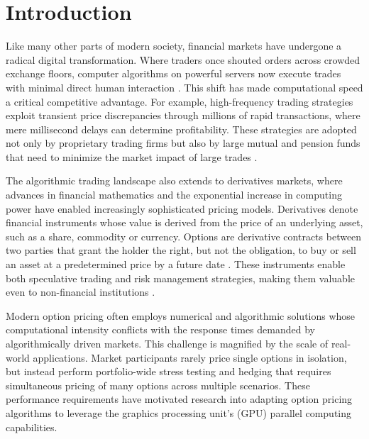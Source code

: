 \documentclass[english,12pt,a4paper,pdftex,sci,utf8]{aaltothesis}
\begin{document}

\section{Introduction}
\thispagestyle{empty}
Like many other parts of modern society, financial markets have undergone a radical digital transformation. Where traders once shouted orders across crowded exchange floors, computer algorithms on powerful servers now execute trades with minimal direct human interaction \cite{mcgowan2010rise, mackenzie2018material}. This shift has made computational speed a critical competitive advantage. For example, high-frequency trading strategies exploit transient price discrepancies through millions of rapid transactions, where mere millisecond delays can determine profitability. These strategies are adopted not only by proprietary trading firms but also by large mutual and pension funds that need to minimize the market impact of large trades \cite{mcgowan2010rise}.

The algorithmic trading landscape also extends to derivatives markets, where advances in financial mathematics \cite{merton1994influence} and the exponential increase in computing power \cite{nordhaus2007two} have enabled increasingly sophisticated pricing models. Derivatives denote financial instruments whose value is derived from the price of an underlying asset, such as a share, commodity or currency. Options are derivative contracts between two parties that grant the holder the right, but not the obligation, to buy or sell an asset at a predetermined price by a future date \cite{hull2018}. These instruments enable both speculative trading and risk management strategies, making them valuable even to non-financial institutions \cite{bartram2009international}.

Modern option pricing often employs numerical and algorithmic solutions whose computational intensity conflicts with the response times demanded by algorithmically driven markets. This challenge is magnified by the scale of real-world applications. Market participants rarely price single options in isolation, but instead perform portfolio-wide stress testing and hedging that requires simultaneous pricing of many options across multiple scenarios. These performance requirements have motivated research into adapting option pricing algorithms to leverage the graphics processing unit's (GPU) parallel computing capabilities.
\end{document}
